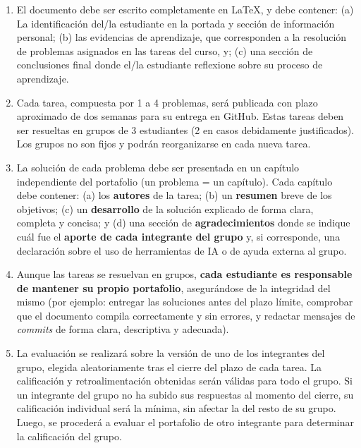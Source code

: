 \documentclass[../portafolio.tex]{subfiles}
\begin{document}
\begin{enumerate}
\item El documento debe ser escrito completamente en \LaTeX, y debe
  contener: (a) La identificación del/la estudiante en la portada y
  sección de información personal; (b) las evidencias de aprendizaje,
  que corresponden a la resolución de problemas asignados en las
  tareas del curso, y; (c) una sección de conclusiones final donde
  el/la estudiante reflexione sobre su proceso de aprendizaje.

\item Cada tarea, compuesta por 1 a 4 problemas, será publicada con
  plazo aproximado de dos semanas para su entrega en
  GitHub. Estas tareas deben ser resueltas en grupos de 3 estudiantes
  (2 en casos debidamente justificados). Los grupos no son fijos y podrán
  reorganizarse en cada nueva tarea.

\item La solución de cada problema debe ser presentada en un capítulo
  independiente del portafolio (un problema = un capítulo). Cada
  capítulo debe contener: (a) los \textbf{autores} de la tarea; (b) un
  \textbf{resumen} breve de los objetivos; (c) un \textbf{desarrollo}
  de la solución explicado de forma clara, completa y concisa; y (d)
  una sección de \textbf{agradecimientos} donde se indique cuál fue el
  \textbf{aporte de cada integrante del grupo} y, si corresponde, una
  declaración sobre el uso de herramientas de IA o de ayuda externa al
  grupo.

\item Aunque las tareas se resuelvan en grupos, \textbf{cada
    estudiante es responsable de mantener su propio portafolio},
  asegurándose de la integridad del mismo (por ejemplo: entregar las
  soluciones antes del plazo límite, comprobar que el documento compila
  correctamente y sin errores, y redactar mensajes de
  \textit{commits} de forma  clara, descriptiva y adecuada).

\item La evaluación se realizará sobre la versión de uno de los
  integrantes del grupo, elegida aleatoriamente tras el cierre del
  plazo de cada tarea. La calificación y retroalimentación obtenidas
  serán válidas para todo el grupo.  Si un integrante del grupo no ha
  subido sus respuestas al momento del cierre, su calificación
  individual será la mínima, sin afectar la del resto de su
  grupo. Luego, se procederá a evaluar el portafolio de otro
  integrante para determinar la calificación del grupo.


\end{enumerate}
\end{document}
